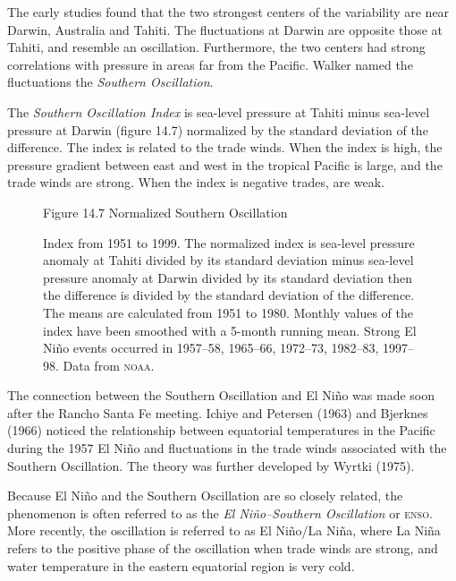 The early studies found that the two strongest centers of the variability are near
Darwin, Australia and Tahiti. The fluctuations at Darwin are opposite those at
Tahiti, and resemble an oscillation. Furthermore, the two centers had strong
correlations with pressure in areas far from the Pacific. Walker named the
fluctuations the \textit{Southern Oscillation}.

The \textit{Southern Oscillation Index} is
sea-level pressure at Tahiti minus sea-level pressure at Darwin (figure 14.7)
normalized by the standard deviation of the difference. The index is related to the
trade winds. When the index is high, the pressure gradient between east and west
in the tropical Pacific is large, and the trade winds are strong. When the index is
negative trades, are weak.

\begin{figure}[t!]
\footnotesize
Figure 14.7 Normalized Southern Oscillation \rule{0pt}{3ex}Index
from 1951 to 1999. The normalized index is sea-level pressure anomaly at Tahiti
divided by its standard deviation minus sea-level pressure anomaly at Darwin
divided by its standard deviation then the difference is divided by the standard
deviation of the difference. The means are calculated from 1951 to 1980. Monthly
values of the index have been smoothed with a 5-month running mean. Strong El
Ni\~{n}o events occurred in 1957--58, 1965--66, 1972--73, 1982--83, 1997--98. Data
from
\textsc{noaa}.
\label{fig:soi}
\vspace{-3ex}
\end{figure}

The connection between the Southern Oscillation and El Ni\~{n}o was made soon after the Rancho Santa Fe meeting. Ichiye and Petersen (1963) and Bjerknes (1966) noticed the relationship between equatorial temperatures in the Pacific during the 1957 El Ni\~{n}o and fluctuations in the trade winds associated with the Southern Oscillation. The theory was further developed by Wyrtki (1975).

Because El Ni\~{n}o and the Southern Oscillation are so closely related, the phenomenon is often referred to as the \textit{El Ni\~{n}o--Southern Oscillation} or \textsc{enso}. More recently, the oscillation is referred to as El Ni\~{n}o/La Ni\~{n}a, where La Ni\~{n}a refers to the positive phase of the oscillation when trade winds are strong, and water temperature in the eastern equatorial region is very cold.

